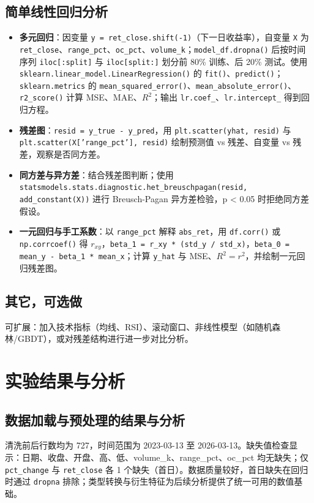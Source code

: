 \documentclass[12pt,a4paper]{article}
\begin{document}
\subsection{简单线性回归分析}
\begin{itemize}[leftmargin=*]
    \item \textbf{多元回归}：因变量 \texttt{y = ret\_close.shift(-1)}（下一日收益率），自变量 \texttt{X} 为 \texttt{ret\_close}、\texttt{range\_pct}、\texttt{oc\_pct}、\texttt{volume\_k}；\texttt{model\_df.dropna()} 后按时间序列 \texttt{iloc[:split]} 与 \texttt{iloc[split:]} 划分前 80\% 训练、后 20\% 测试。使用 \texttt{sklearn.linear\_model.LinearRegression()} 的 \texttt{fit()}、\texttt{predict()}；\texttt{sklearn.metrics} 的 \texttt{mean\_squared\_error()}、\texttt{mean\_absolute\_error()}、\texttt{r2\_score()} 计算 MSE、MAE、$R^2$；输出 \texttt{lr.coef\_}、\texttt{lr.intercept\_} 得到回归方程。
    \item \textbf{残差图}：\texttt{resid = y\_true - y\_pred}，用 \texttt{plt.scatter(yhat, resid)} 与 \texttt{plt.scatter(X['range\_pct'], resid)} 绘制预测值 vs 残差、自变量 vs 残差，观察是否同方差。
    \item \textbf{同方差与异方差}：结合残差图判断；使用 \texttt{statsmodels.stats.diagnostic.het\_breuschpagan(resid, add\_constant(X))} 进行 Breusch-Pagan 异方差检验，p < 0.05 时拒绝同方差假设。
    \item \textbf{一元回归与手工系数}：以 \texttt{range\_pct} 解释 \texttt{abs\_ret}，用 \texttt{df.corr()} 或 \texttt{np.corrcoef()} 得 $r_{xy}$，\texttt{beta\_1 = r\_xy * (std\_y / std\_x)}，\texttt{beta\_0 = mean\_y - beta\_1 * mean\_x}；计算 \texttt{y\_hat} 与 MSE、$R^2=r^2$，并绘制一元回归残差图。
\end{itemize}

\subsection{其它，可选做}
可扩展：加入技术指标（均线、RSI）、滚动窗口、非线性模型（如随机森林/GBDT），或对残差结构进行进一步对比分析。

\section{实验结果与分析}

\subsection{数据加载与预处理的结果与分析}
清洗前后行数均为 727，时间范围为 2023-03-13 至 2026-03-13。缺失值检查显示：日期、收盘、开盘、高、低、volume\_k、range\_pct、oc\_pct 均无缺失；仅 \texttt{pct\_change} 与 \texttt{ret\_close} 各 1 个缺失（首日）。数据质量较好，首日缺失在回归时通过 \texttt{dropna} 排除；类型转换与衍生特征为后续分析提供了统一可用的数值基础。
\end{document}
